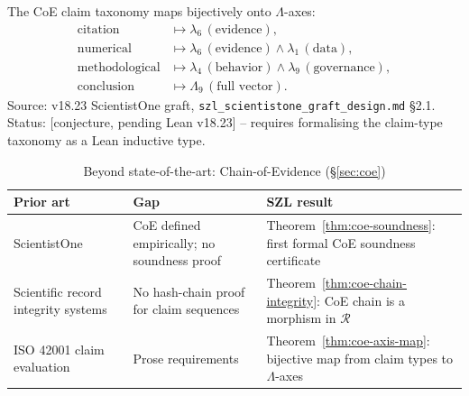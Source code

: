 \begin{theorem}
\label{thm:coe-axis-map}
The CoE claim taxonomy maps bijectively onto $\Lambda$-axes:
\begin{align*}
  \mathrm{citation}       &\mapsto \lambda_6\,(\text{evidence}),\\
  \mathrm{numerical}      &\mapsto \lambda_6\,(\text{evidence}) \wedge \lambda_1\,(\text{data}),\\
  \mathrm{methodological} &\mapsto \lambda_4\,(\text{behavior}) \wedge \lambda_9\,(\text{governance}),\\
  \mathrm{conclusion}     &\mapsto \Lambda_9\,(\text{full vector}).
\end{align*}
\textup{Source:} v18.23 ScientistOne graft,
\texttt{szl\_scientistone\_graft\_design.md} \S{}2.1.
\textup{Status:} [conjecture, pending Lean v18.23] -- requires
formalising the claim-type taxonomy as a Lean inductive type.


\end{theorem}

\bsota
\label{bsota:coe}

\begin{table}[h!]
\centering\small
\caption{Beyond state-of-the-art: Chain-of-Evidence (\S\ref{sec:coe})}
\label{tab:bsota-coe}
\begin{tabular}{p{3.8cm}p{3.8cm}p{4.8cm}}
\hline
\textbf{Prior art} & \textbf{Gap} & \textbf{SZL result} \\
\hline
ScientistOne~\cite{Meng2026} & CoE defined empirically; no soundness proof & Theorem~\ref{thm:coe-soundness}: first formal CoE soundness certificate \\
Scientific record integrity systems & No hash-chain proof for claim sequences & Theorem~\ref{thm:coe-chain-integrity}: CoE chain is a morphism in $\mathcal{R}$ \\
ISO 42001 claim evaluation & Prose requirements & Theorem~\ref{thm:coe-axis-map}: bijective map from claim types to $\Lambda$-axes \\
\hline
\end{tabular}
\end{table}

